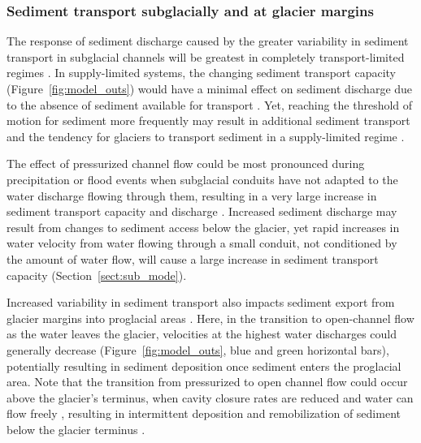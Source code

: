 \documentclass[11pt]{article}
\begin{document}
\begin{spacing}{1}
          \subsubsection{Sediment transport subglacially and at glacier margins}
        
          The response of sediment discharge caused by the greater variability in sediment transport in subglacial channels will be greatest in completely transport-limited regimes \citep{kasmalkar2019}.
          In supply-limited systems, the changing sediment transport capacity (Figure~\ref{fig:model_outs}) would have a minimal effect on sediment discharge due to the absence of sediment available for transport \citep{delaney2019}.
          Yet, reaching the threshold of motion for sediment more frequently may result in additional sediment transport and the tendency for glaciers to transport sediment in a supply-limited regime \citep[e.g.][]{herman2015}.
        
          The effect of pressurized channel flow could be most pronounced during precipitation or flood events when subglacial conduits have not adapted to the water discharge flowing through them, resulting in a very large increase in sediment transport capacity and discharge \citep[e.g.][]{cowan1988,delaney2019}.
         Increased sediment discharge may result from changes to sediment access below the glacier, yet rapid increases in water velocity from water flowing through a small conduit, not conditioned by the amount of water flow, will cause a large increase in sediment transport capacity (Section~\ref{sect:sub_mode}).
          
          Increased variability in sediment transport also impacts sediment export from glacier margins into proglacial areas \citep[e.g.][]{delaney2017,perolo2018}.
          Here, in the transition to open-channel flow as the water leaves the glacier, velocities at the highest water discharges could generally decrease (Figure~\ref{fig:model_outs}, blue and green horizontal bars), potentially resulting in sediment deposition once sediment enters the proglacial area.
         Note that the transition from pressurized to open channel flow could occur above the glacier's terminus, when cavity closure rates are reduced and water can flow freely \citep{egli2021b}, resulting in intermittent deposition and remobilization of sediment below the glacier terminus \citep{perolo2018}.
          

\end{spacing}
\end{document}
